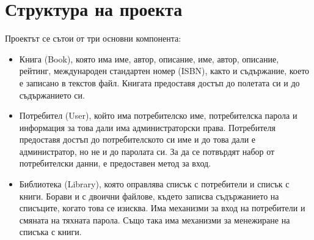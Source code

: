 \section{Структура на проекта}
Проектът се сътои от три основни компонента:
\begin{itemize}
    \item Книга (Book), която има име, автор, описание, име, автор, описание, рейтинг, международен стандартен номер (ISBN), както и съдържание, което е записано в текстов файл. Книгата предоставя достъп до полетата си и до съдържанието си.

    \item Потребител (User), който има потребителско име, потребителска парола и информация за това дали има администраторски права. Потребителя предоставя достъп до потребителското си име и до това дали е администратор, но не и до паролата си. За да се потвърдят набор от потребителски данни, е предоставен метод за вход.

    \item Библиотека (Library), която оправлява списък с потребители и списък с книги. Борави и с двоични файлове, където записва съдържанието на списъците, когато това се изисква. Има механизми за вход на потребители и смяната на тяхната парола. Също така има механизми за менежиране на списъка с книги.
\end{itemize}